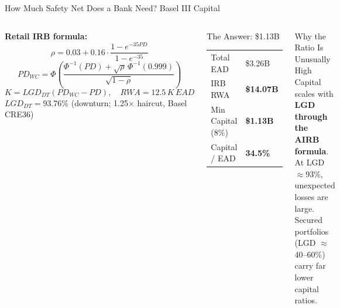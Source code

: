 \documentclass[aspectratio=169,11pt]{beamer}
\newcommand{\B}[1]{\textbf{#1}}
\begin{document}
\begin{frame}[shrink=10]{How Much Safety Net Does a Bank Need? Basel III Capital}
  \begin{columns}[T]
      \small\textbf{Retail IRB formula:}
      \[\rho = 0.03 + 0.16\cdot\frac{1-e^{-35 PD}}{1-e^{-35}}\]
      \[PD_{WC} = \Phi\!\left(\frac{\Phi^{-1}(PD) + \sqrt{\rho}\,\Phi^{-1}(0.999)}{\sqrt{1-\rho}}\right)\]
      \[K = LGD_{DT}(PD_{WC} - PD), \quad RWA = 12.5\,K\,EAD\]
      \vspace{2pt}
      \footnotesize$LGD_{DT} = 93.76\%$ (downturn; 1.25$\times$ haircut, Basel CRE36)

      \begin{block}{The Answer: \$1.13B}\small
        \begin{tabular}{ll}
          \toprule
          Total EAD         & \$3.26B \\
          IRB RWA           & \B{\$14.07B} \\
          Min Capital (8\%) & \B{\$1.13B} \\
          Capital / EAD     & \B{34.5\%} \\
          \bottomrule
        \end{tabular}
      \end{block}
      \vspace{4pt}
      \begin{alertblock}{Why the Ratio Is Unusually High}\small
        Capital scales with \B{LGD through the AIRB formula}. At LGD $\approx$93\%, unexpected losses are large. Secured portfolios (LGD $\approx$40--60\%) carry far lower capital ratios.
      \end{alertblock}
  \end{columns}
\end{frame}
\end{document}
